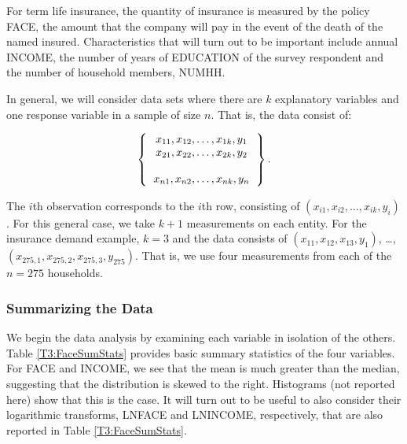 For term life insurance, the quantity of insurance is measured by
the policy FACE, the amount that the company will pay in the event
of the death of the named insured. Characteristics that will turn
out to be important include annual INCOME, the number of years of
EDUCATION of the survey respondent and the number of household
members, NUMHH.


\linejed{}

In general, we will consider data sets where there are $k$
explanatory variables and one response variable in a sample of size
$n$. That is, the data consist of:

\begin{center}
\begin{equation*}
\left\{
\begin{tabular}{c}
$x_{11},x_{12},\ldots,x_{1k},y_1$ \\
$x_{21},x_{22},\ldots,x_{2k},y_2$ \\
\\
$x_{n1},x_{n2},\ldots,x_{nk},y_n$%
\end{tabular}%
\right\} .
\end{equation*}
\end{center}

\noindent The $i$th observation corresponds to the $i$th row,
consisting of $(x_{i1},x_{i2},\ldots,x_{ik},y_i)$. For this general
case, we take $k+1$ measurements on each entity. For the insurance
demand example, $k=3$ and the data
consists of $(x_{11},x_{12},x_{13}, y_1)$, \ldots , $%
(x_{275,1},x_{275,2},x_{275,3},y_{275})$. That is, we use four
measurements from each of the $n=275$ households.

\subsubsection*{Summarizing the Data}


We begin the data analysis by examining each variable in isolation
of the others. Table \ref{T3:FaceSumStats} provides basic summary
statistics of the four variables. For FACE and INCOME, we see that
the mean is much greater than the median, suggesting that the
distribution is skewed to the right. Histograms (not reported here)
show that this is the case. It will turn out to be useful to also
consider their logarithmic transforms, LNFACE and LNINCOME,
respectively, that are also reported in Table \ref{T3:FaceSumStats}.

